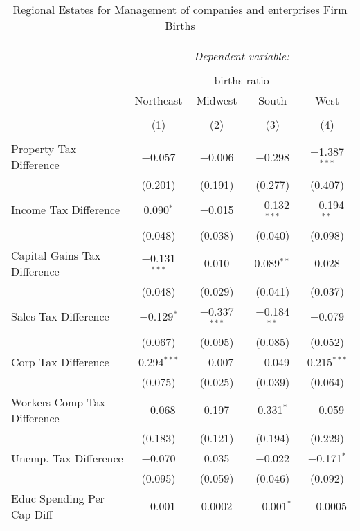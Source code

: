 
\begin{table}[!htbp] \centering 
  \caption{Regional Estates for  Management of companies and enterprises Firm Births} 
  \label{} 
\begin{tabular}{@{\extracolsep{5pt}}lcccc} 
\\[-1.8ex]\hline 
\hline \\[-1.8ex] 
 & \multicolumn{4}{c}{\textit{Dependent variable:}} \\ 
\cline{2-5} 
\\[-1.8ex] & \multicolumn{4}{c}{births ratio} \\ 
 & Northeast & Midwest & South & West \\ 
\\[-1.8ex] & (1) & (2) & (3) & (4)\\ 
\hline \\[-1.8ex] 
 Property Tax Difference & $-$0.057 & $-$0.006 & $-$0.298 & $-$1.387$^{***}$ \\ 
  & (0.201) & (0.191) & (0.277) & (0.407) \\ 
  Income Tax Difference & 0.090$^{*}$ & $-$0.015 & $-$0.132$^{***}$ & $-$0.194$^{**}$ \\ 
  & (0.048) & (0.038) & (0.040) & (0.098) \\ 
  Capital Gains Tax Difference & $-$0.131$^{***}$ & 0.010 & 0.089$^{**}$ & 0.028 \\ 
  & (0.048) & (0.029) & (0.041) & (0.037) \\ 
  Sales Tax Difference & $-$0.129$^{*}$ & $-$0.337$^{***}$ & $-$0.184$^{**}$ & $-$0.079 \\ 
  & (0.067) & (0.095) & (0.085) & (0.052) \\ 
  Corp Tax Difference & 0.294$^{***}$ & $-$0.007 & $-$0.049 & 0.215$^{***}$ \\ 
  & (0.075) & (0.025) & (0.039) & (0.064) \\ 
  Workers Comp Tax Difference & $-$0.068 & 0.197 & 0.331$^{*}$ & $-$0.059 \\ 
  & (0.183) & (0.121) & (0.194) & (0.229) \\ 
  Unemp. Tax Difference & $-$0.070 & 0.035 & $-$0.022 & $-$0.171$^{*}$ \\ 
  & (0.095) & (0.059) & (0.046) & (0.092) \\ 
  Educ Spending Per Cap Diff & $-$0.001 & 0.0002 & $-$0.001$^{*}$ & $-$0.0005 \\ 

\end{tabular}
\end{table}
